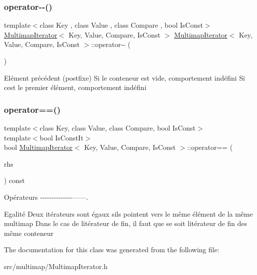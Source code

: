 \subsubsection{\texorpdfstring{operator-\/-\/()}{operator--()}\hspace{0.1cm}{\footnotesize\ttfamily [2/2]}}
{\footnotesize\ttfamily template$<$class Key , class Value , class Compare , bool Is\+Const$>$ \\
\hyperlink{classMultimapIterator}{Multimap\+Iterator}$<$ Key, Value, Compare, Is\+Const $>$ \hyperlink{classMultimapIterator}{Multimap\+Iterator}$<$ Key, Value, Compare, Is\+Const $>$\+::operator-\/-\/ (\begin{DoxyParamCaption}\item[{int}]{ }\end{DoxyParamCaption})}

Elément précédent (postfixe) Si le conteneur est vide, comportement indéfini Si c\textquotesingle{}est le premier élément, comportement indéfini \mbox{\label{classMultimapIterator_ad8ae7f78f86f880a611c9bc4939ec98b}} 
\subsubsection{\texorpdfstring{operator==()}{operator==()}}
{\footnotesize\ttfamily template$<$class Key, class Value, class Compare, bool Is\+Const$>$ \\
template$<$bool Is\+Const\+It$>$ \\
bool \hyperlink{classMultimapIterator}{Multimap\+Iterator}$<$ Key, Value, Compare, Is\+Const $>$\+::operator== (\begin{DoxyParamCaption}\item[{const \hyperlink{classMultimapIterator}{Multimap\+Iterator}$<$ Key, Value, Compare, Is\+Const\+It $>$ \&}]{rhs }\end{DoxyParamCaption}) const\hspace{0.3cm}{\ttfamily [inline]}}



Opérateurs -\/-\/-\/-\/-\/-\/-\/-\/-\/-\/-\/-\/-\/-\/------. 

Egalité Deux itérateurs sont égaux s\textquotesingle{}ils pointent vers le même élément de la même multimap Dans le cas de l\textquotesingle{}itérateur de fin, il faut que se soit l\textquotesingle{}itérateur de fin des même conteneur 

The documentation for this class was generated from the following file\+:\begin{DoxyCompactItemize}
\item 
src/multimap/Multimap\+Iterator.\+h\end{DoxyCompactItemize}
